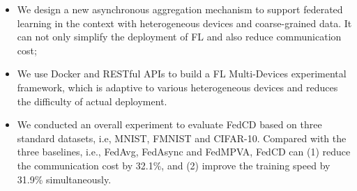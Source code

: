 \documentclass[twoside,twocolumn]{article}
\begin{document}
\begin{spacing}{1.0}
	\begin{itemize}
	\item We design a new asynchronous aggregation mechanism to support federated learning in the context with heterogeneous devices and coarse-grained data. It can not only simplify the deployment of FL and also reduce communication cost;
	\item We use Docker and RESTful APIs to build a FL Multi-Devices experimental framework, which is adaptive to various heterogeneous devices and reduces the difficulty of actual deployment.
	\item We conducted an overall experiment to evaluate FedCD based on three standard datasets, i.e, MNIST, FMNIST and CIFAR-10. Compared with the three baselines, i.e.,  FedAvg, FedAsync and FedMPVA, FedCD can (1) reduce the communication cost by 32.1\%, and (2) improve the training speed by 31.9\% simultaneously.
	\end{itemize}
	

\end{spacing}
\end{document}
